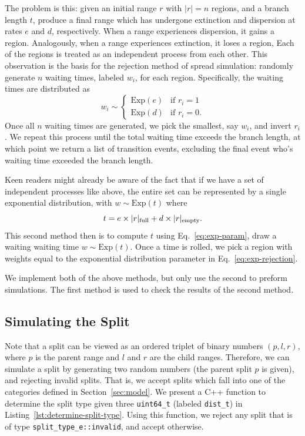\documentclass{article}
\begin{document}
The problem is this: given an initial range \( r \) with \( |r| = n \) regions,
and a branch length \( t \), produce a final range which has undergone
extinction and dispersion at rates \( e \) and \( d \), respectively.
When a range experiences dispersion, it gains a region.
Analogously, when a range experiences extinction, it loses a region, Each of
the regions is treated as an independent process from each other.
This observation is the basis for the rejection method of spread simulation:
randomly generate \( n \) waiting times, labeled \( w_i \), for each region.
Specifically, the waiting times are distributed as
\begin{equation}
	\label{eq:exp-rejection} w_i \sim
	\begin{cases}
		\text{Exp}(e) & \text{if } r_i
		= 1                            \\ \text{Exp}(d) & \text{if } r_i = 0.
	\end{cases}
\end{equation}
Once all $n$ waiting times are generated, we pick the smallest, say $w_i$, and
invert $r_i$.
We repeat this process until the total waiting time exceeds the branch length,
at which point we return a list of transition events, excluding the final event
who's waiting time exceeded the branch length.

Keen readers might already be aware of the fact that if we have a set of
independent processes like above, the entire set can be represented by a single
exponential distribution, with \(w \sim \text{Exp}(t) \) where
\begin{equation}
	\label{eq:exp-param} t = e \times |r|_\text{full} + d \times |r|_\text{empty}.
\end{equation}
This second method then is to compute \( t \) using Eq.~\ref{eq:exp-param},
draw a waiting waiting time \( w \sim \text{Exp}(t) \).
Once a time is rolled, we pick a region with weights equal to the exponential
distribution parameter in Eq.~\ref{eq:exp-rejection}.

We implement both of the above methods, but only use the second to preform
simulations.
The first method is used to check the results of the second method.

\subsection{Simulating the Split}

Note that a split can be viewed as an ordered triplet of binary numbers \(
(p,l,r) \), where $p$ is the parent range and $l$ and $r$ are the child ranges.
Therefore, we can simulate a split by generating two random numbers (the parent
split $p$ is given), and rejecting invalid splits.
That is, we accept splits which fall into one of the categories defined in
Section~\ref{sec:model}.
We present a C++ function to determine the split type given three
\texttt{uint64_t} (labeled \texttt{dist_t}) in
Listing~\ref{lst:determine-split-type}.
Using this function, we reject any split that is of type
\texttt{split_type_e::invalid}, and accept otherwise.
\end{document}
